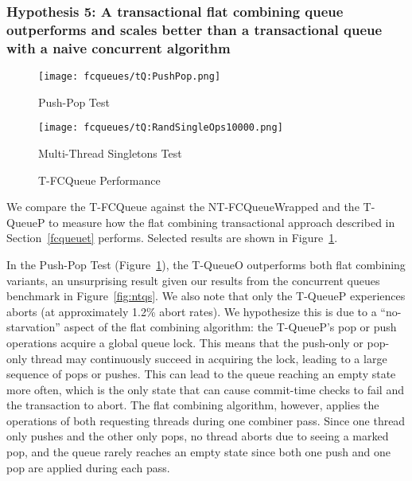 \vspace{12pt}
\noindent{}

\subsubsection{Hypothesis 5: A transactional flat combining queue outperforms and scales better than a transactional queue with a naive concurrent algorithm}

\begin{figure}[t]
    \centering
	\begin{minipage}{0.45\textwidth}
	    \texttt{[image: fcqueues/tQ:PushPop.png]}
        \caption*{Push-Pop Test}
	\end{minipage}
   	\begin{minipage}{0.45\textwidth}
	    \texttt{[image: fcqueues/tQ:RandSingleOps10000.png]}
        \caption{Multi-Thread Singletons Test}
	\end{minipage}
        \caption{T-FCQueue Performance}
    \label{fig:tqs}
\end{figure}

We compare the T-FCQueue against the NT-FCQueueWrapped and the T-QueueP to measure how the flat combining transactional approach described in Section~\ref{fcqueuet} performs. Selected results are shown in Figure~\ref{fig:tqs}.

In the Push-Pop Test (Figure~\ref{fig:tqs}), the T-QueueO outperforms both flat combining variants, an unsurprising result given our results from the concurrent queues benchmark in Figure~\ref{fig:ntqs}. We also note that only the T-QueueP experiences aborts (at approximately 1.2\% abort rates). We hypothesize this is due to a ``no-starvation'' aspect of the flat combining algorithm: the T-QueueP's pop or push operations acquire a global queue lock. This means that the push-only or pop-only thread may continuously succeed in acquiring the lock, leading to a large sequence of pops or pushes. This can lead to the queue reaching an empty state more often, which is the only state that can cause commit-time checks to fail and the transaction to abort. The flat combining algorithm, however, applies the operations of both requesting threads during one combiner pass. Since one thread only pushes and the other only pops, no thread aborts due to seeing a marked pop, and the queue rarely reaches an empty state since both one push and one pop are applied during each pass.

